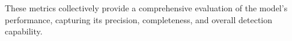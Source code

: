 These metrics collectively provide a comprehensive evaluation of the model's performance, capturing its precision, completeness, and overall detection capability.


\begin{comment}{
\subsection{Gaussian Filtering}
Gaussian filtering is an image processing technique employed for noise reduction and image smoothing. This is accomplished by applying a filter kernel whose weights are defined by a Gaussian function. This function is a bell-shaped curve that assigns higher weights to pixels closer to the center and progressively lower weights to those further away. The Gaussian kernel is defined by the Gaussian function:
\[
G(x, y) = \frac{1}{2\pi\sigma^2} e^{-\frac{x^2 + y^2}{2\sigma^2}}
\]
where \( G(x, y) \) represents the weight at coordinates \( (x, y) \) in the kernel, and \( \sigma \) is the standard deviation controlling the spread of the distribution.

To apply Gaussian filtering to an image, the kernel is centered at each pixel, and the neighbouring pixels are multiplied by the corresponding weights in the kernel. The result is then summed to produce the filtered pixel value.
The convolution \cite{AboutConvolutions} operation (seen in Figure \ref{fig:conv}) can be expressed mathematically as:
\[
I'(x, y) = \sum_{i=-\infty}^{\infty} \sum_{j=-\infty}^{\infty} I(x+i, y+j) \cdot G(i, j)
\]

where \( I(x, y) \) is the intensity of the pixel at coordinates \( (x, y) \) in the original image, \( I'(x, y) \) is the filtered intensity at the same coordinates, and \( G(i, j) \) is the weight at coordinates \( (i, j) \) in the Gaussian kernel.

\begin{figure}[h!]
    \centering
    \texttt{[image: imgs/conv.png]}
    \caption{Convolution of Image with Kernel \cite{conv}}
    \label{fig:conv}
\end{figure}

The standard deviation \( \sigma \) of the Gaussian distribution determines the amount of smoothing applied to the image. A larger \( \sigma \) value results in a wider kernel and more significant smoothing, while a smaller \( \sigma \) value produces a narrower kernel and less smoothing. Thus, \( \sigma \) controls the trade-off between blurring and preserving image details.

In the case of this project, a $3\times3$ kernel is used with the standard deviation, $\sigma$, calculated automatically by OpenCV based on the kernel size. $\sigma$ is typically chosen such that the majority of the Gaussian distribution falls within the kernel boundaries. This ensures that the blur effect is applied evenly across neighbouring pixels. $\sigma$ is expected to be relatively small for the kernel size used ($3\times3$), typically ranging from around 0.8 to 1.2.}
\end{comment}
